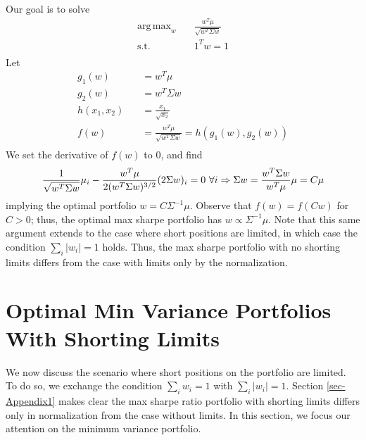 \documentclass[10pt,twoside,titlepage]{article}   %
\DeclareMathOperator*{\argmax}{arg\,max}
\begin{document}
Our goal is to solve
\begin{equation*}
\begin{aligned}
\argmax_{w} \quad & \frac{w^T \mu}{ \sqrt{ w^T \Sigma w } } \\
\textrm{s.t.} \quad & 1^T w = 1\\
\end{aligned}
\end{equation*}
Let
\begin{equation*}
\begin{aligned}
g_1( w ) \quad & = w^T \mu \\
g_2( w ) \quad & = w^T \Sigma w \\
h( x_1 , x_2 ) \quad & = \frac{x_1}{ \sqrt{ x_2 } } \\
f( w ) \quad & = \frac{ w^T\mu}{ \sqrt{ w^T \Sigma w } } = h( g_1(w),g_2(w)) \\
\end{aligned}
\end{equation*}
We set the derivative of $f(w)$ to $0$, and find
\begin{equation*}
\frac{1}{\sqrt{w^T \Sigma w}} \mu_i - \frac{ w^T \mu }{ 2(w^T \Sigma w)^{3/2} } ( 2\Sigma w)_i = 0 \textrm{ } \forall i \Rightarrow \Sigma w = \frac{ w^T \Sigma w }{ w^T \mu } \mu = C \mu \\
\end{equation*}
implying the optimal portfolio $w = C\Sigma^{-1}\mu$. 
Observe that $f(w)=f(Cw)$ for $C>0$; thus, the optimal max sharpe portfolio has $w \propto \Sigma^{-1}\mu$. 
Note that this same argument extends to the case where short positions are limited, 
in which case the condition $\sum_i |w_i| = 1$ holds. 
Thus, the max sharpe portfolio with no shorting limits differs from the case with limits only by the normalization.

\section{Optimal Min Variance Portfolios With Shorting Limits}\label{sec-Appendix2}
We now discuss the scenario where short positions on the portfolio are limited. 
To do so, we exchange the condition $\sum_i w_i = 1$ with $\sum_i |w_i| = 1$.
Section \ref{sec-Appendix1} makes clear the max sharpe ratio portfolio with shorting limits differs only in normalization from the case without limits. 
In this section, we focus our attention on the minimum variance portfolio.
\end{document}
